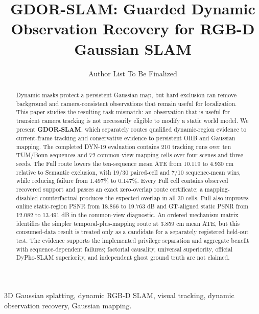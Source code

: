 \documentclass[journal]{IEEEtran}
\begin{document}
\title{GDOR-SLAM: Guarded Dynamic Observation Recovery for RGB-D Gaussian SLAM}

\author{Author List To Be Finalized}

\maketitle

\begin{abstract}
Dynamic masks protect a persistent Gaussian map, but hard exclusion can remove background and camera-consistent observations that remain useful for localization.
This paper studies the resulting task mismatch: an observation that is useful for transient camera tracking is not necessarily eligible to modify a static world model.
We present \textbf{GDOR-SLAM}, which separately routes qualified dynamic-region evidence to current-frame tracking and conservative evidence to persistent ORB and Gaussian mapping.
The completed DYN-19 evaluation contains 210 tracking runs over ten TUM/Bonn sequences and 72 common-view mapping cells over four scenes and three seeds.
The Full route lowers the ten-sequence mean ATE from 10.119 to 4.930 cm relative to Semantic exclusion, with 19/30 paired-cell and 7/10 sequence-mean wins, while reducing failure from 1.497\% to 0.147\%.
Every Full cell contains observed recovered support and passes an exact zero-overlap route certificate; a mapping-disabled counterfactual produces the expected overlap in all 30 cells.
Full also improves online static-region PSNR from 18.866 to 19.763 dB and GT-aligned static PSNR from 12.082 to 13.491 dB in the common-view diagnostic.
An ordered mechanism matrix identifies the simpler temporal-plus-mapping route at 3.859 cm mean ATE, but this consumed-data result is treated only as a candidate for a separately registered held-out test.
The evidence supports the implemented privilege separation and aggregate benefit with sequence-dependent failures; factorial causality, universal superiority, official DyPho-SLAM superiority, and independent ghost ground truth are not claimed.
\end{abstract}

\begin{IEEEkeywords}
3D Gaussian splatting, dynamic RGB-D SLAM, visual tracking, dynamic observation recovery, Gaussian mapping.
\end{IEEEkeywords}










\end{document}
